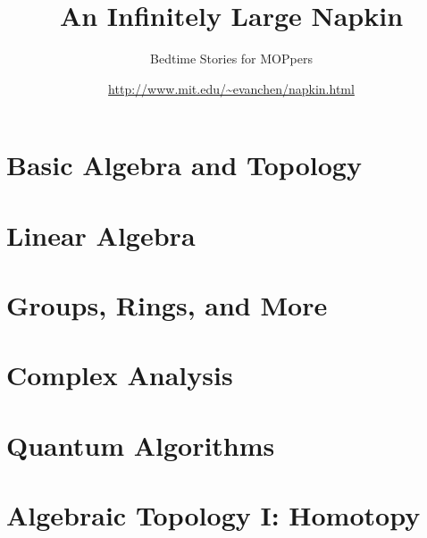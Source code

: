 \documentclass[11pt,numbers=noenddot]{scrreprt}
\begin{document}
\title{An Infinitely Large Napkin}
\subtitle{Bedtime Stories for MOPpers}
\date{\url{http://www.mit.edu/~evanchen/napkin.html}}
\maketitle



\tableofcontents




\part{Basic Algebra and Topology}






\part{Linear Algebra}


\part{Groups, Rings, and More}





\part{Complex Analysis}



%



\part{Quantum Algorithms}



\part{Algebraic Topology I: Homotopy}

\end{document}
